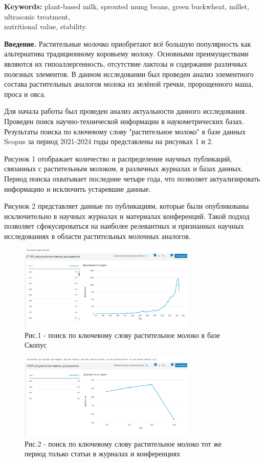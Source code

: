 {\bfseries Keywords:} plant-based milk, sprouted mung beans, green
buckwheat, millet, ultrasonic treatment, \\nutritional value, stability.

\begin{multicols}{2}
{\bfseries Введение.} Растительные молочко приобретают всё большую
популярность как альтернатива традиционному коровьему молоку. Основными
преимуществами являются их гипоаллергенность, отсутствие лактозы и
содержание различных полезных элементов. В данном исследовании был
проведен анализ элементного состава растительных аналогов молока из
зелёной гречки, пророщенного маша, проса и овса.

Для начала работы был проведен анализ актуальности данного исследования.
Проведен поиск научно-технической информации в наукометрических базах.
Результаты поиска по ключевому слову "растительное молоко" в базе данных
Scopus за период 2021-2024 годы представлены на рисунках 1 и 2.

Рисунок 1 отображает количество и распределение научных публикаций,
связанных с растительным молоком, в различных журналах и базах данных.
Период поиска охватывает последние четыре года, что позволяет
актуализировать информацию и исключить устаревшие данные.

Рисунок 2 представляет данные по публикациям, которые были опубликованы
исключительно в научных журналах и материалах конференций. Такой подход
позволяет сфокусироваться на наиболее релевантных и признанных научных
исследованиях в области растительных молочных аналогов.

\end{multicols}

\begin{figure}[H]
	\centering
	\includegraphics[width=0.75\textwidth]{media/pish/image47}
	\caption*{Рис.1 - поиск по ключевому слову растительное молоко в базе Скопус}
\end{figure}

\begin{figure}[H]
	\centering
	\includegraphics[width=0.75\textwidth]{media/pish/image48}
	\caption*{Рис.2 - поиск по ключевому слову растительное молоко тот же период только статьи в журналах и конференциях}
\end{figure}

